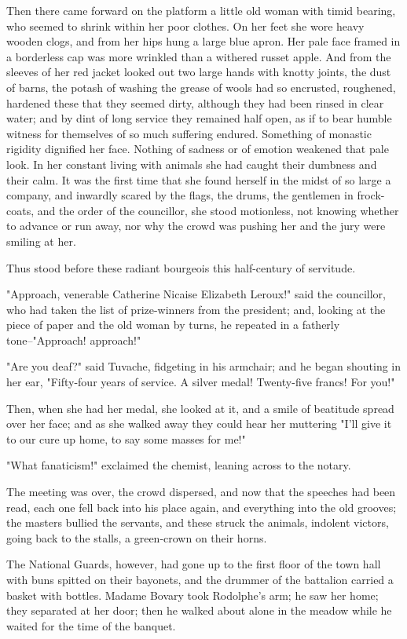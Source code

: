 \documentclass{tufte-book}
\begin{document}
Then there came forward on the platform a little old woman with timid
bearing, who seemed to shrink within her poor clothes. On her feet she
wore heavy wooden clogs, and from her hips hung a large blue apron. Her
pale face framed in a borderless cap was more wrinkled than a withered
russet apple. And from the sleeves of her red jacket looked out two
large hands with knotty joints, the dust of barns, the potash of washing
the grease of wools had so encrusted, roughened, hardened these that
they seemed dirty, although they had been rinsed in clear water; and
by dint of long service they remained half open, as if to bear humble
witness for themselves of so much suffering endured. Something of
monastic rigidity dignified her face. Nothing of sadness or of emotion
weakened that pale look. In her constant living with animals she had
caught their dumbness and their calm. It was the first time that she
found herself in the midst of so large a company, and inwardly scared by
the flags, the drums, the gentlemen in frock-coats, and the order of the
councillor, she stood motionless, not knowing whether to advance or run
away, nor why the crowd was pushing her and the jury were smiling at
her.

Thus stood before these radiant bourgeois this half-century of
servitude.

"Approach, venerable Catherine Nicaise Elizabeth Leroux!" said the
councillor, who had taken the list of prize-winners from the president;
and, looking at the piece of paper and the old woman by turns, he
repeated in a fatherly tone--"Approach! approach!"

"Are you deaf?" said Tuvache, fidgeting in his armchair; and he began
shouting in her ear, "Fifty-four years of service. A silver medal!
Twenty-five francs! For you!"

Then, when she had her medal, she looked at it, and a smile of beatitude
spread over her face; and as she walked away they could hear her
muttering "I'll give it to our cure up home, to say some masses for me!"

"What fanaticism!" exclaimed the chemist, leaning across to the notary.

The meeting was over, the crowd dispersed, and now that the speeches had
been read, each one fell back into his place again, and everything into
the old grooves; the masters bullied the servants, and these struck the
animals, indolent victors, going back to the stalls, a green-crown on
their horns.

The National Guards, however, had gone up to the first floor of the
town hall with buns spitted on their bayonets, and the drummer of the
battalion carried a basket with bottles. Madame Bovary took Rodolphe's
arm; he saw her home; they separated at her door; then he walked about
alone in the meadow while he waited for the time of the banquet.
\end{document}
